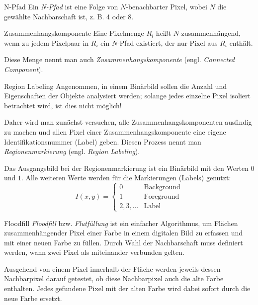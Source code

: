 \begin{defi}{N-Pfad}
    Ein \emph{N-Pfad} ist eine Folge von $N$-benachbarter Pixel, wobei $N$ die gewählte Nachbarschaft ist, z. B. 4 oder 8.
\end{defi}

\begin{defi}{Zusammenhangskomponente}
    Eine Pixelmenge $R_i$ heißt $N$-zusammenhängend, wenn zu jedem Pixelpaar in $R_i$ ein $N$-Pfad existiert, der nur Pixel aus $R_i$ enthält.

    Diese Menge nennt man auch \emph{Zusammenhangskomponente} (engl. \emph{Connected Component}).
\end{defi}

\begin{defi}[Segmentierung]{Region Labeling}
    Angenommen, in einem Binärbild sollen die Anzahl und Eigenschaften der Objekte analysiert werden;
    solange jedes einzelne Pixel isoliert betrachtet wird, ist dies nicht möglich!

    Daher wird man zunächst versuchen, alle Zusammenhangskomponenten ausfindig zu machen und allen Pixel einer Zusammenhangskomponente eine eigene Identifikationsnummer (Label) geben.
    Diesen Prozess nennt man \emph{Regionenmarkierung} (engl. \emph{Region Labeling}).

    Das Ausgangsbild bei der Regionenmarkierung ist ein Binärbild mit den Werten $0$ und $1$.
    Alle weiteren Werte werden für die Markierungen (Labels) genutzt:
    \[
        I(x, y) =
        \begin{cases}
            0            & \text{Background} \\
            1            & \text{Foreground} \\
            2, 3, \ldots & \text{Label}
        \end{cases}
    \]
\end{defi}

\begin{defi}{Floodfill}
    \emph{Floodfill} bzw. \emph{Flutfüllung} ist ein einfacher Algorithmus, um Flächen zusammenhängender Pixel einer Farbe in einem digitalen Bild zu erfassen und mit einer neuen Farbe zu füllen.
    Durch Wahl der Nachbarschaft muss definiert werden, wann zwei Pixel als miteinander verbunden gelten.

    Ausgehend von einem Pixel innerhalb der Fläche werden jeweils dessen Nachbarpixel darauf getestet, ob diese Nachbarpixel auch die alte Farbe enthalten.
    Jedes gefundene Pixel mit der alten Farbe wird dabei sofort durch die neue Farbe ersetzt.
\end{defi}


